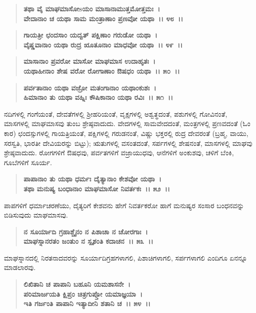 \begin{verse}
\textbf{ತಥಾ ವೈ ಮಾಘಮಾಸೋsಯಂ ಮಾಸಾನಾಮುತ್ತಮೋತ್ತಮಃ~।}\\\textbf{ವೇದಾನಾಂ ಚ ಯಥಾ ಸಾಮ ಮಂತ್ರಾಣಾಂ ಪ್ರಣವೋ ಯಥಾ~।। ೪೮~।। }
\end{verse}

\begin{verse}
\textbf{ಗಾಯತ್ರೀ ಛಂದಸಾಂ ಯದ್ವತ್ ಪಕ್ಷಿಣಾಂ ಗರುಡೋ ಯಥಾ~।}\\\textbf{ವೈಷ್ಣವಾನಾಂ ಯಥಾ ರುದ್ರ ೠತೂನಾಂ ಮಾಧವೋ ಯಥಾ~।। ೪೯~।।}
\end{verse}

\begin{verse}
\textbf{ಮಾಸಾನಾಂ ಪ್ರವರೋ ಮಾಸೋ ಮಾಘಮಾಸ ಉದಾಹೃತಃ~।}\\\textbf{ಯಥಾಹೀನಾಂ ಶೇಷ ವರೋ ರೋಗಾಣಾಂ ಔಷಧಂ ಯಥಾ~।। ೫೦~।।}
\end{verse}

\begin{verse}
\textbf{ಪರ್ವತಾನಾಂ ಯಥಾ ವಜ್ರೋ ಮತಂಗಾನಾಂ ಯಥಾಂಕುಶಃ~।}\\\textbf{ಹಿಮಾನಾಂ ತು ಯಥಾ ವಹ್ನಿಃ ಕೌಷಿಕಾನಾಂ ಯಥಾ ರವಿಃ~।। ೫೧~।।}
\end{verse}

ನದಿಗಳಲ್ಲಿ ಗಂಗೆಯಂತೆ, ದೇವತೆಗಳಲ್ಲಿ ಶ‍್ರೀಹರಿಯಂತೆ, ವೃಕ್ಷಗಳಲ್ಲಿ ಅಶ್ವತ್ಥದಂತೆ, ಪಶುಗಳಲ್ಲಿ ಗೋವಿನಂತೆ, ಮಾಸಗಳಲ್ಲಿ ಮಾಘಮಾಸವು ತುಂಬ ಶ್ರೇಷ್ಠವಾದುದು. ವೇದಗಳಲ್ಲಿ ಸಾಮವೇದದಂತೆ, ಮಂತ್ರಗಳಲ್ಲಿ ಪ್ರಣವದಂತೆ (ಓಂ ಕಾರ) ಛಂದಸ್ಸುಗಳಲ್ಲಿ ಗಾಯತ್ರಿಯಂತೆ, ಪಕ್ಷಿಗಳಲ್ಲಿ ಗರುಡನಂತೆ, ವಿಷ್ಣು ಭಕ್ತರಲ್ಲಿ ರುದ್ರ ದೇವರಂತೆ (ಬ್ರಹ್ಮ, ವಾಯು, ಸರಸ್ವತಿ, ಭಾರತೀ ದೇವಿಯರನ್ನು ಬಿಟ್ಟು); ಋತುಗಳಲ್ಲಿ ವಸಂತದಂತೆ, ಸರ್ಪಗಳಲ್ಲಿ ಶೇಷನಂತೆ, ಮಾಸಗಳಲ್ಲಿ ಮಾಘವು ಶ್ರೇಷ್ಠವಾದುದು. ರೋಗಗಳಿಗೆ ಔಷಧವು, ಪರ್ವತಗಳಿಗೆ ವಜ್ರಾಯುಧವು, ಆನೆಗಳಿಗೆ ಅಂಕುಶವು, ಚಳಿಗೆ ಬೆಂಕಿ, ಗೂಬೆಗಳಿಗೆ ಸೂರ್ಯ.

\begin{verse}
\textbf{ಪಾಪಾನಾಂ ತು ಯಥಾ ಧರ್ಮಃ ದೈತ್ಯಾನಾಂ ಕೇಶವೋ ಯಥಾ~।}\\\textbf{ತಥಾ ಮನುಷ್ಯ ಬಂಧಾನಾಂ ಮಾಘಮಾಸೋ ನಿವರ್ತಕಃ~।। ೫೨~।।}
\end{verse}

ಪಾಪಗಳಿಗೆ ಧರ್ಮಾಚರಣೆಯು, ದೈತ್ಯರಿಗೆ ಕೇಶವನು ಹೇಗೆ ನಿವರ್ತಕರೋ ಹಾಗೆ ಮನುಷ್ಯರ ಸಂಸಾರ ಬಂಧನವನ್ನು ಬಿಡಿಸುವುದು ಮಾಘಮಾಸವು.

\begin{verse}
\textbf{ನ ಸೂರ್ಯಾದಿ ಗ್ರಹಾಶ್ಚೈನಂ ನ ಪಿಶಾಚಾ ನ ಚೋರಗಾಃ~।}\\\textbf{ಮಾಘಸ್ನಾನರತಂ ಜಂತುಂ ನ ಸ್ಪೃಶಂತಿ ಕದಾಚನ~।। ೫೩~।।}
\end{verse}

ಮಾಘಸ್ನಾನದಲ್ಲಿ ನಿರತನಾದವರನ್ನು ಸೂರ್ಯಾದಿಗ್ರಹಗಳಾಗಲಿ, ಪಿಶಾಚಿಗಳಾಗಲಿ, ಸರ್ಪಗಳಾಗಲಿ ಎಂದಿಗೂ ಏನನ್ನೂ ಮಾಡಲಾರವು.

\begin{verse}
\textbf{ಲಿಖಿತಾನಿ ಚ ಪಾಪಾನಿ ಬಹೂನಿ ಯಮಶಾಸನೇ~।}\\\textbf{ಪರಿಮಾರ್ಜಯತಿ ಕ್ಷಿಪ್ರಂ ಚಿತ್ರಗುಪ್ತೋ ಯಮಾಜ್ಞಯಾ~।}\\\textbf{ಇತಿ ಗರ್ಜಂತಿ ಪಾಪಾನಿ ಇತ್ಯಾದೀನಿ ಶತಾನಿ ಚ~।। ೫೪~।।}
\end{verse}

